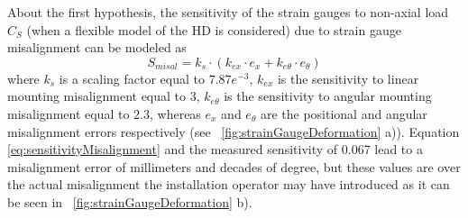 About the first hypothesis, the sensitivity of the strain gauges to non-axial load $C_S$ (when a flexible model of the HD is considered) due to strain gauge misalignment can be modeled as
\begin{equation}
S_{misal}= k_s \cdot (k_{ex} \cdot e_x + k_{e\theta} \cdot e_{\theta})
\label{eq:sensitivityMisalignment}
\end{equation}
where $k_s$ is a scaling factor equal to $7.87e^{-3}$, $k_{ex}$ is the sensitivity to linear mounting misalignment  equal to $3$, $k_{e\theta}$ is the sensitivity to angular mounting misalignment equal to $2.3$, whereas $e_x$ and $e_{\theta}$ are the positional and angular misalignment errors respectively (see \figurename \ \ref{fig:strainGaugeDeformation} a)). Equation \eqref{eq:sensitivityMisalignment} and the measured sensitivity of 0.067 lead to a misalignment error of millimeters and decades of degree, but these values are over the actual misalignment the installation operator may have introduced as it can be seen in \figurename \ \ref{fig:strainGaugeDeformation} b).
%
\begin{figure*}[]
	\centering
	\def\svgwidth{2\columnwidth}
	\begin{footnotesize}
		
	\end{footnotesize}
	\caption{(a) A possible cause of high sensitivity to non-axial load is the strain gauges's mounting misalignment. $e_x$ is the linear displacement and the angular one is $e_{\theta}$ are highlighted. (b) A detail of the mounted strain gauges on the torque sensor. (c) For the FEM analysis a more dense grid mesh for the zone of interest has been used. For each area the average strain along the radial direction has been computed. (d) The FEM analysis results of the torque sensor, and of the flexible spline  deformation under non-axial load (e).}
	\label{fig:strainGaugeDeformation}
\end{figure*}

